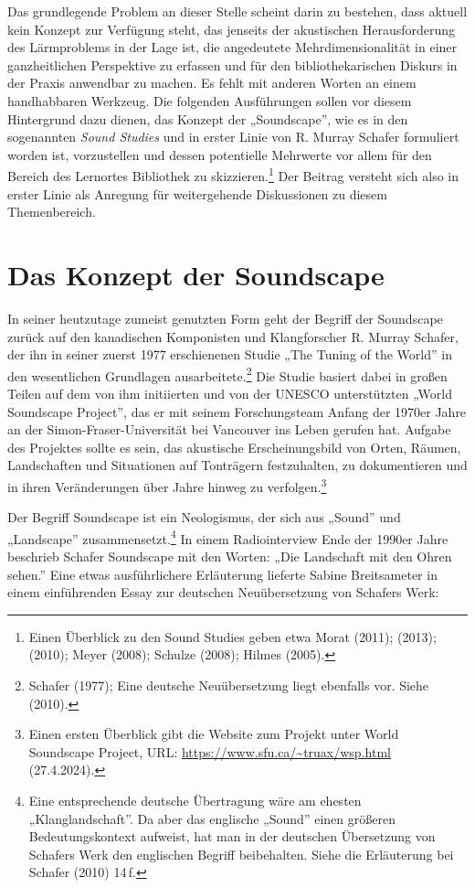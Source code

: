\documentclass[a4paper,
fontsize=11pt,
oneside,
numbers=noperiodatend,
parskip=half-,
bibliography=totoc,
final
]{scrartcl}
\begin{document}
Das grundlegende Problem an dieser Stelle scheint darin zu bestehen,
dass aktuell kein Konzept zur Verfügung steht, das jenseits der
akustischen Herausforderung des Lärmproblems in der Lage ist, die
angedeutete Mehrdimensionalität in einer ganzheitlichen Perspektive zu
erfassen und für den bibliothekarischen Diskurs in der Praxis anwendbar
zu machen. Es fehlt mit anderen Worten an einem handhabbaren Werkzeug.
Die folgenden Ausführungen sollen vor diesem Hintergrund dazu dienen,
das Konzept der „Soundscape'', wie es in den sogenannten \emph{Sound
Studies} und in erster Linie von R. Murray Schafer formuliert worden
ist, vorzustellen und dessen potentielle Mehrwerte vor allem für den
Bereich des Lernortes Bibliothek zu skizzieren.\footnote{Einen Überblick
  zu den Sound Studies geben etwa Morat (2011); (2013); (2010); Meyer
  (2008); Schulze (2008); Hilmes (2005).} Der Beitrag versteht sich also
in erster Linie als Anregung für weitergehende Diskussionen zu diesem
Themenbereich.

\hypertarget{das-konzept-der-soundscape}{%
\section{Das Konzept der Soundscape}\label{das-konzept-der-soundscape}}

In seiner heutzutage zumeist genutzten Form geht der Begriff der
Soundscape zurück auf den kanadischen Komponisten und Klangforscher R.
Murray Schafer, der ihn in seiner zuerst 1977 erschienenen Studie „The
Tuning of the World'' in den wesentlichen Grundlagen
ausarbeitete.\footnote{Schafer (1977); Eine deutsche Neuübersetzung
  liegt ebenfalls vor. Siehe (2010).} Die Studie basiert dabei in großen
Teilen auf dem von ihm initiierten und von der UNESCO unterstützten
„World Soundscape Project'', das er mit seinem Forschungsteam Anfang der
1970er Jahre an der Simon-Fraser-Universität bei Vancouver ins Leben
gerufen hat. Aufgabe des Projektes sollte es sein, das akustische
Erscheinungsbild von Orten, Räumen, Landschaften und Situationen auf
Tonträgern festzuhalten, zu dokumentieren und in ihren Veränderungen
über Jahre hinweg zu verfolgen.\footnote{Einen ersten Überblick gibt die
  Website zum Projekt unter World Soundscape Project, URL:
  \url{https://www.sfu.ca/~truax/wsp.html} (27.4.2024).}

Der Begriff Soundscape ist ein Neologismus, der sich aus „Sound'' und
„Landscape'' zusammensetzt.\footnote{Eine entsprechende deutsche
  Übertragung wäre am ehesten „Klanglandschaft''. Da aber das englische
  „Sound'' einen größeren Bedeutungskontext aufweist, hat man in der
  deutschen Übersetzung von Schafers Werk den englischen Begriff
  beibehalten. Siehe die Erläuterung bei Schafer (2010) 14\,f.} In einem
Radiointerview Ende der 1990er Jahre beschrieb Schafer Soundscape mit
den Worten: „Die Landschaft mit den Ohren sehen.'' Eine etwas
ausführlichere Erläuterung lieferte Sabine Breitsameter in einem
einführenden Essay zur deutschen Neuübersetzung von Schafers Werk:
\end{document}
